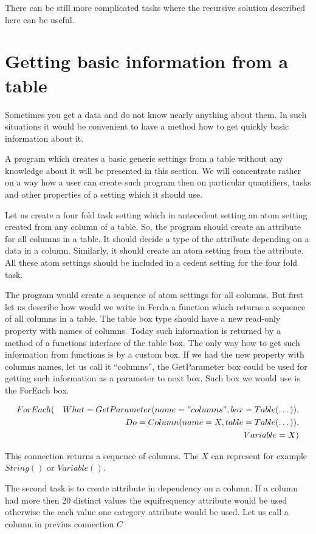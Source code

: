 \documentclass[a4paper,12pt]{book}
\begin{document}
There can be still more complicated tasks where the recursive solution described here can be useful.

\section{Getting basic information from a table}
Sometimes you get a data and do not know nearly anything about them. In such situations it would be convenient to have a method how to get quickly basic information about it.

A program which creates a basic generic settings from a table without any knowledge about it will be presented in this section. We will concentrate rather on a way how a user can create such program then on particular quantifiers, tasks and other properties of a setting which it should use.

Let us create a four fold task setting which in antecedent setting an atom setting created from any column of a table. So, the program should create an attribute for all columns in a table. It should decide a type of the attribute depending on a data in a column. Similarly, it should create an atom setting from the attribute. All these atom settings should be included in a cedent setting for the four fold task.

The program would create a sequence of atom settings for all columns. But first let us describe how would we write in Ferda a function which returns a sequence of all columns in a table. The table box type should have a new read-only property with names of columns. Today such information is returned by a method of a functions interface of the table box. The only way how to get such information from functions is by a custom box. If we had the new property with columns names, let us call it ``columns'', the GetParameter box could be used for getting such information as a parameter to next box. Such box we would use is the ForEach box.

\begin{eqnarray*}
ForEach(&&What=GetParameter(name="columns", box=Table(\dots)), \\&& Do=Column(name=X, table=Table(\dots)), \\&& Variable=X)
\end{eqnarray*}

This connection returns a sequence of columns. The $X$ can represent for example $String()$ or $Variable()$.

The second task is to create attribute in dependency on a column. If a column had more then 20 distinct values the equifrequency attribute would be used otherwise the each value one category attribute would be used. Let us call a column in previus connection $C$
\end{document}

